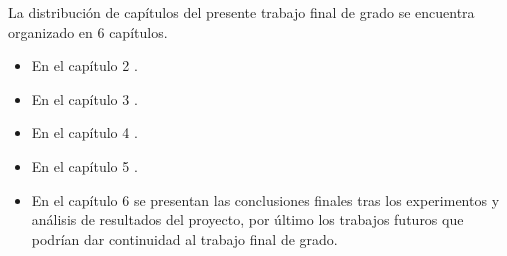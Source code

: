 La distribución de capítulos del presente trabajo final de grado se encuentra organizado en 6 capítulos.
\begin{itemize}

\item En el capítulo 2 .
\item En el capítulo 3  . %
\item En el capítulo 4  .
\item En el capítulo 5  .

\item En el capítulo 6 se presentan las conclusiones finales tras los experimentos y análisis de resultados del proyecto, por último los trabajos futuros que podrían dar continuidad al trabajo final de grado. 
\end{itemize}
